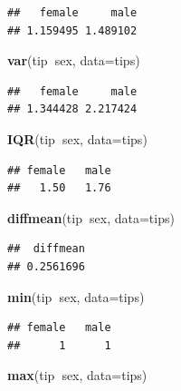 \documentclass[10pt,ngerman,onside]{article}
\newenvironment{Shaded}{\begin{snugshade}}{\end{snugshade}}
\newcommand{\KeywordTok}[1]{\textcolor[rgb]{0.13,0.29,0.53}{\textbf{#1}}}
\newcommand{\DataTypeTok}[1]{\textcolor[rgb]{0.13,0.29,0.53}{#1}}
\newcommand{\OperatorTok}[1]{\textcolor[rgb]{0.81,0.36,0.00}{\textbf{#1}}}
\newcommand{\NormalTok}[1]{#1}
\begin{document}
\begin{verbatim}
##   female     male 
## 1.159495 1.489102
\end{verbatim}

\begin{Shaded}
\begin{Highlighting}[]
\KeywordTok{var}\NormalTok{(tip}\OperatorTok{~}\NormalTok{sex, }\DataTypeTok{data=}\NormalTok{tips)}
\end{Highlighting}
\end{Shaded}

\begin{verbatim}
##   female     male 
## 1.344428 2.217424
\end{verbatim}

\begin{Shaded}
\begin{Highlighting}[]
\KeywordTok{IQR}\NormalTok{(tip}\OperatorTok{~}\NormalTok{sex, }\DataTypeTok{data=}\NormalTok{tips)}
\end{Highlighting}
\end{Shaded}

\begin{verbatim}
## female   male 
##   1.50   1.76
\end{verbatim}

\begin{Shaded}
\begin{Highlighting}[]
\KeywordTok{diffmean}\NormalTok{(tip}\OperatorTok{~}\NormalTok{sex, }\DataTypeTok{data=}\NormalTok{tips)}
\end{Highlighting}
\end{Shaded}

\begin{verbatim}
##  diffmean 
## 0.2561696
\end{verbatim}

\begin{Shaded}
\begin{Highlighting}[]
\KeywordTok{min}\NormalTok{(tip}\OperatorTok{~}\NormalTok{sex, }\DataTypeTok{data=}\NormalTok{tips)}
\end{Highlighting}
\end{Shaded}

\begin{verbatim}
## female   male 
##      1      1
\end{verbatim}

\begin{Shaded}
\begin{Highlighting}[]
\KeywordTok{max}\NormalTok{(tip}\OperatorTok{~}\NormalTok{sex, }\DataTypeTok{data=}\NormalTok{tips)}
\end{Highlighting}
\end{Shaded}
\end{document}
